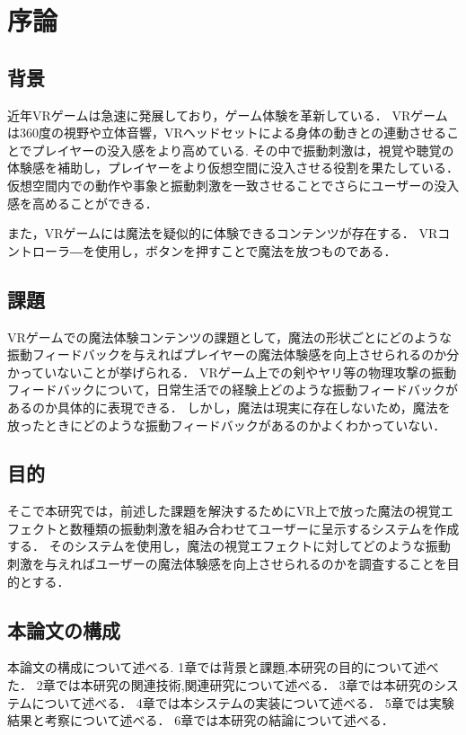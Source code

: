 \chapter{序論}
\section{背景}
近年VRゲームは急速に発展しており，ゲーム体験を革新している．
VRゲームは360度の視野や立体音響，VRヘッドセットによる身体の動きとの連動させることでプレイヤーの没入感をより高めている.
その中で振動刺激は，視覚や聴覚の体験感を補助し，プレイヤーをより仮想空間に没入させる役割を果たしている．
仮想空間内での動作や事象と振動刺激を一致させることでさらにユーザーの没入感を高めることができる．

また，VRゲームには魔法を疑似的に体験できるコンテンツが存在する．
VRコントローラ―を使用し，ボタンを押すことで魔法を放つものである．


\section{課題}
VRゲームでの魔法体験コンテンツの課題として，魔法の形状ごとにどのような振動フィードバックを与えればプレイヤーの魔法体験感を向上させられるのか分かっていないことが挙げられる．
VRゲーム上での剣やヤリ等の物理攻撃の振動フィードバックについて，日常生活での経験上どのような振動フィードバックがあるのか具体的に表現できる．
しかし，魔法は現実に存在しないため，魔法を放ったときにどのような振動フィードバックがあるのかよくわかっていない．


\section{目的}
そこで本研究では，前述した課題を解決するためにVR上で放った魔法の視覚エフェクトと数種類の振動刺激を組み合わせてユーザーに呈示するシステムを作成する．
そのシステムを使用し，魔法の視覚エフェクトに対してどのような振動刺激を与えればユーザーの魔法体験感を向上させられるのかを調査することを目的とする．

\section{本論文の構成}
本論文の構成について述べる.
1章では背景と課題,本研究の目的について述べた．
2章では本研究の関連技術,関連研究について述べる．
3章では本研究のシステムについて述べる．
4章では本システムの実装について述べる．
5章では実験結果と考察について述べる．
6章では本研究の結論について述べる．
